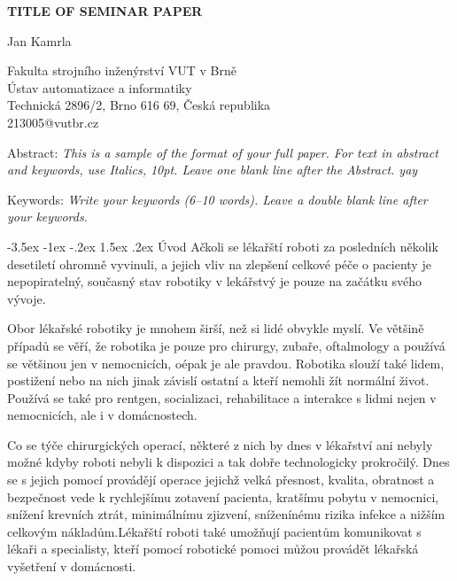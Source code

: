 \documentclass[a4paper,12pt]{article}
\makeatletter
\theoremstyle{definition}
\renewcommand\section{\@startsection {section}{1}{\z@}%
                                   {-3.5ex \@plus -1ex \@minus -.2ex}%
                                   {1.5ex \@plus.2ex}%
                                   {\large\bfseries}}
\makeatother
\begin{document}
\pagestyle{empty}

\begin{center}
{\bf \Large TITLE OF SEMINAR PAPER}
\end{center}

\smallskip
\begin{center}
{\large Jan Kamrla}
\end{center}

\smallskip
\begin{center}
Fakulta strojního inženýrství VUT v Brně\\
Ústav automatizace a informatiky\\
Technická 2896/2, Brno 616 69, Česká republika\\
213005@vutbr.cz\\
\end{center}

\bigskip
\noindent Abstract: \textit{This is a sample of the format of your
full paper. For text in abstract and keywords, use Italics, 10pt. Leave one blank line after the Abstract. yay}

\vspace*{10pt} \noindent Keywords: \textit{Write your keywords (6--10 words).
Leave a double blank line after your keywords.}

\bigskip
\section{Úvod}
Ačkoli se lékařští roboti za posledních několik desetiletí ohromně vyvinuli, a jejich
vliv na zlepšení celkové péče o pacienty je nepopiratelný, současný stav robotiky v lekářstvý je pouze na začátku svého vývoje.

Obor lékařské robotiky je mnohem širší, než si lidé obvykle myslí. Ve většině případů se věří, že robotika je pouze pro chirurgy, zubaře, oftalmology a používá se většinou jen v nemocnicích, oépak je ale pravdou. Robotika slouží také lidem, postižení nebo na nich jinak závislí ostatní a kteří nemohli žít normální život. Používá se také pro rentgen, socializaci, rehabilitace a interakce s lidmi nejen v nemocnicích, ale i v domácnostech.

Co se týče chirurgických operací, některé z nich by dnes v lékařství ani nebyly možné kdyby
roboti nebyli k dispozici a tak dobře technologicky prokročilý. Dnes se s jejich pomocí provádějí operace jejichž velká přesnost, kvalita, obratnost a bezpečnost vede k rychlejšímu zotavení pacienta, kratšímu pobytu v nemocnici, snížení krevních ztrát, minimálnímu zjizvení, sníženínému rizika infekce a nižším celkovým nákladům.Lékařští roboti také umožňují pacientům komunikovat s lékaři a specialisty, kteří pomocí robotické pomoci můžou provádět lékařská vyšetření v domácnosti.
\end{document}
